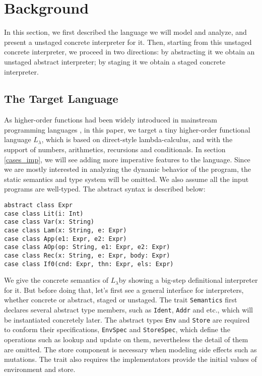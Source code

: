 \newcommand{\TLang}{$L_\lambda$}

\section{Background}

In this section, we first described the language we will model and analyze, and present a unstaged concrete 
interpreter for it. Then, starting from this unstaged concrete interpreter, we proceed in two directions:
by abstracting it we obtain an unstaged abstract interpreter; by staging it we obtain a staged concrete
interpreter.

\subsection{The Target Language} \label{bg_lang}

As higher-order functions had been widely introduced in mainstream programming languages , in this paper, 
we target a tiny higher-order functional language \TLang, which is based on direct-style lambda-calculus, 
and with the support of numbers, arithmetics, recursions and conditionals.
In section \ref{cases_imp}, we will see adding more imperative features to the language.
Since we are mostly interested in analyzing the dynamic behavior of the program, the static semantics and
type system will be omitted. We also assume all the input programs are well-typed.
The abstract syntax is described below:

\begin{lstlisting}
abstract class Expr
case class Lit(i: Int)
case class Var(x: String)
case class Lam(x: String, e: Expr)
case class App(e1: Expr, e2: Expr)
case class AOp(op: String, e1: Expr, e2: Expr)
case class Rec(x: String, e: Expr, body: Expr)
case class If0(cnd: Expr, thn: Expr, els: Expr)
\end{lstlisting}

We give the concrete semantics of \TLang by showing a big-step definitional interpreter for it.
But before doing that, let's first see a general interface for interpreters, whether concrete or abstract, 
staged or unstaged. The trait \texttt{Semantics} first declares several abstract type members, such as \texttt{Ident},
\texttt{Addr} and etc., which will be instantiated concretely later. The abstract types \texttt{Env} and \texttt{Store}
are required to conform their specifications, \texttt{EnvSpec} and \texttt{StoreSpec}, which define 
the operations such as lookup and update on them, nevertheless the detail of them are omitted.  
The store component is necessary when modeling side effects such as mutations. 
The trait also requires the implementators provide the initial values of environment and store.

